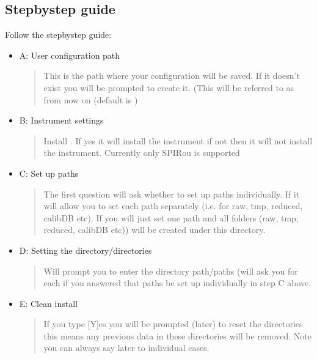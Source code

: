 \documentclass[a4paper,10pt,english]{report}
\begin{document}
\subsection{Step\sphinxhyphen{}by\sphinxhyphen{}step guide}
\label{\detokenize{user/installation:step-by-step-guide}}
Follow the step\sphinxhyphen{}by\sphinxhyphen{}step guide:
\begin{itemize}
\item {} 
A: User configuration path
\begin{quote}

This is the path where your configuration will be saved. If it doesn’t exist you will be prompted to create it. (This will be referred to as {\hyperref[\detokenize{misc/glossary:term-drs-uconfig}]{}}
from now on (default is )
\end{quote}

\item {} 
B: Instrument settings
\begin{quote}

Install {\hyperref[\detokenize{misc/glossary:term-instrument}]{}}.
If yes it will install the instrument if not then it will not install the instrument. Currently only SPIRou is supported
\end{quote}

\item {} 
C: Set up paths
\begin{quote}

The first question will ask  whether to set up paths individually. If 
it will allow you to set each path separately (i.e. for raw, tmp, reduced, calibDB etc). If 
you will just set one path and all folders (raw, tmp, reduced, calibDB etc)) will be created under this directory.
\end{quote}

\item {} 
D: Setting the directory/directories
\begin{quote}

Will prompt you to enter the directory path/paths (will ask you for each if you answered that paths be set up individually in step C above.
\end{quote}

\item {} 
E: Clean install
\begin{quote}

If you type {[}Y{]}es you will be prompted (later) to reset the directories this means any previous data in these directories will be removed. Note you can always say later to individual cases.
\end{quote}

\end{itemize}
\end{document}
